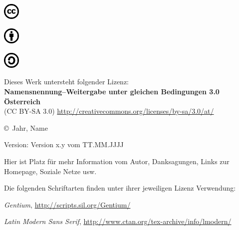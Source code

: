 
\begin{center}

\ffextra\small%
\parbox{0.80cm}{\includegraphics[height=0.80cm]{images/cc-cc.pdf}}\hspace{1mm}\parbox{0.80cm}{\includegraphics[height=0.80cm]{images/cc-by.pdf}}\hspace{1mm}\parbox{0.80cm}{\includegraphics[height=0.80cm]{images/cc-sa.pdf}}\hspace{2mm}\parbox{10cm}{%
Dieses Werk untersteht folgender Lizenz: \\
\textbf{Namensnennung--Weitergabe unter gleichen Bedingungen 3.0 Österreich}\\
(CC BY-SA 3.0) \href{http://creativecommons.org/licenses/by-sa/3.0/at/}{http://creativecommons.org/licenses/by-sa/3.0/at/}
}

\end{center}


\begin{center}

\vspace{5mm}

\copyright\ Jahr, Name

Version: Version x.y vom TT.MM.JJJJ

\ludusleoniskasten

\vfill

Hier ist Platz für mehr Information vom Autor, Danksagungen, Links zur Homepage, Soziale Netze usw.

\vfill

Die folgenden Schriftarten finden unter ihrer jeweiligen Lizenz Verwendung: 

\textit{Gentium}, \href{http://scripts.sil.org/Gentium/}{http://scripts.sil.org/Gentium/}

\textit{Latin Modern Sans Serif}, \href{http://www.ctan.org/tex-archive/info/lmodern/}{http://www.ctan.org/tex-archive/info/lmodern/}

\end{center}

\newpage
